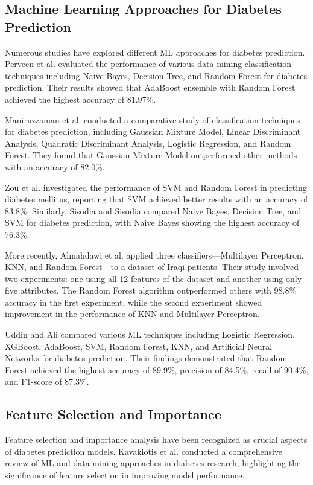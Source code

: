 \documentclass[conference]{IEEEtran}
\begin{document}
\subsection{Machine Learning Approaches for Diabetes Prediction}
Numerous studies have explored different ML approaches for diabetes prediction. Perveen et al. \cite{perveen2016} evaluated the performance of various data mining classification techniques including Naive Bayes, Decision Tree, and Random Forest for diabetes prediction. Their results showed that AdaBoost ensemble with Random Forest achieved the highest accuracy of 81.97\%.

Maniruzzaman et al. \cite{maniruzzaman2017} conducted a comparative study of classification techniques for diabetes prediction, including Gaussian Mixture Model, Linear Discriminant Analysis, Quadratic Discriminant Analysis, Logistic Regression, and Random Forest. They found that Gaussian Mixture Model outperformed other methods with an accuracy of 82.0\%.

Zou et al. \cite{zou2018} investigated the performance of SVM and Random Forest in predicting diabetes mellitus, reporting that SVM achieved better results with an accuracy of 83.8\%. Similarly, Sisodia and Sisodia \cite{sisodia2018} compared Naive Bayes, Decision Tree, and SVM for diabetes prediction, with Naive Bayes showing the highest accuracy of 76.3\%.

More recently, Almahdawi et al. \cite{almahdawi2023} applied three classifiers—Multilayer Perceptron, KNN, and Random Forest—to a dataset of Iraqi patients. Their study involved two experiments: one using all 12 features of the dataset and another using only five attributes. The Random Forest algorithm outperformed others with 98.8\% accuracy in the first experiment, while the second experiment showed improvement in the performance of KNN and Multilayer Perceptron.

Uddin and Ali \cite{uddin2023} compared various ML techniques including Logistic Regression, XGBoost, AdaBoost, SVM, Random Forest, KNN, and Artificial Neural Networks for diabetes prediction. Their findings demonstrated that Random Forest achieved the highest accuracy of 89.9\%, precision of 84.5\%, recall of 90.4\%, and F1-score of 87.3\%.

\subsection{Feature Selection and Importance}
Feature selection and importance analysis have been recognized as crucial aspects of diabetes prediction models. Kavakiotis et al. \cite{kavakiotis2017} conducted a comprehensive review of ML and data mining approaches in diabetes research, highlighting the significance of feature selection in improving model performance.
\end{document}
